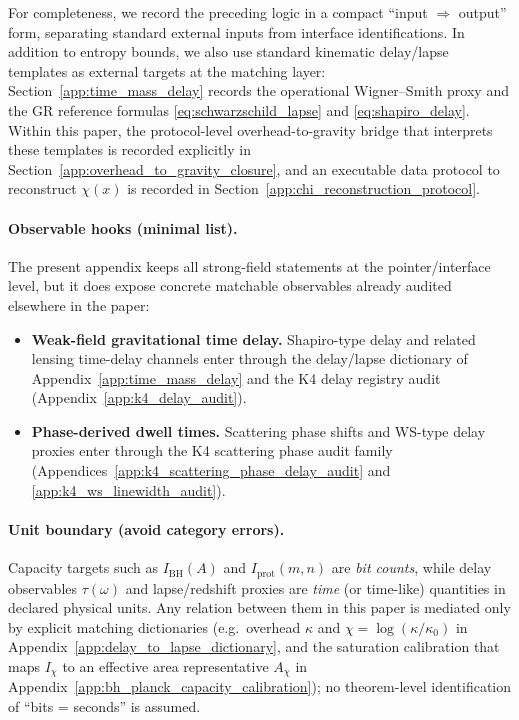 For completeness, we record the preceding logic in a compact ``input $\Rightarrow$ output'' form, separating standard external inputs from interface identifications.
In addition to entropy bounds, we also use standard kinematic delay/lapse templates as external targets at the matching layer: Section~\ref{app:time_mass_delay} records the operational Wigner--Smith proxy and the GR reference formulas \eqref{eq:schwarzschild_lapse} and \eqref{eq:shapiro_delay}.
Within this paper, the protocol-level overhead-to-gravity bridge that interprets these templates is recorded explicitly in Section~\ref{app:overhead_to_gravity_closure}, and an executable data protocol to reconstruct $\chi(x)$ is recorded in Section~\ref{app:chi_reconstruction_protocol}.

\paragraph{Observable hooks (minimal list).}
\MatchTag The present appendix keeps all strong-field statements at the pointer/interface level, but it does expose concrete matchable observables already audited elsewhere in the paper:
\begin{itemize}
\item \textbf{Weak-field gravitational time delay.} Shapiro-type delay and related lensing time-delay channels enter through the delay/lapse dictionary of Appendix~\ref{app:time_mass_delay} and the K4 delay registry audit (Appendix~\ref{app:k4_delay_audit}).
\item \textbf{Phase-derived dwell times.} Scattering phase shifts and WS-type delay proxies enter through the K4 scattering phase audit family (Appendices~\ref{app:k4_scattering_phase_delay_audit} and \ref{app:k4_ws_linewidth_audit}).
\end{itemize}

\paragraph{Unit boundary (avoid category errors).}
\AuditTag Capacity targets such as $I_{\mathrm{BH}}(A)$ and $I_{\mathrm{prot}}(m,n)$ are \emph{bit counts}, while delay observables $\tau(\omega)$ and lapse/redshift proxies are \emph{time} (or time-like) quantities in declared physical units.
Any relation between them in this paper is mediated only by explicit matching dictionaries (e.g.\ overhead $\kappa$ and $\chi=\log(\kappa/\kappa_0)$ in Appendix~\ref{app:delay_to_lapse_dictionary}, and the saturation calibration that maps $I_\chi$ to an effective area representative $A_\chi$ in Appendix~\ref{app:bh_planck_capacity_calibration}); no theorem-level identification of ``bits = seconds'' is assumed.

